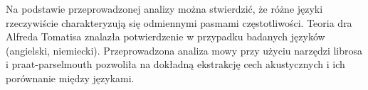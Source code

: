 Na podstawie przeprowadzonej analizy można stwierdzić, że różne języki rzeczywiście charakteryzują się odmiennymi pasmami częstotliwości. Teoria dra Alfreda Tomatisa znalazła potwierdzenie w przypadku badanych języków (angielski, niemiecki). Przeprowadzona analiza mowy przy użyciu narzędzi librosa i praat-parselmouth pozwoliła na dokładną ekstrakcję cech akustycznych i ich porównanie między językami.

